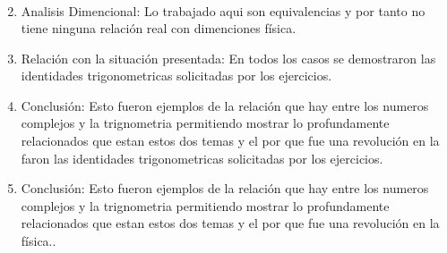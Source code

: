 \documentclass[12pt]{exam}
\begin{document}
\begin{enumerate}
\begin{align*}
				\end{align*}
			\item Analisis Dimencional: Lo trabajado aqui son equivalencias y por tanto no tiene ninguna relación real con dimenciones física.
			\item  Relación con la situación presentada: En todos los casos se demostraron las identidades trigonometricas solicitadas por los ejercicios.
			\item Conclusión: Esto fueron ejemplos de la relación que hay entre los numeros complejos y la trignometria permitiendo mostrar lo profundamente relacionados que estan estos dos temas y el por que fue una revolución en la faron las identidades trigonometricas solicitadas por los ejercicios.
			\item Conclusión: Esto fueron ejemplos de la relación que hay entre los numeros complejos y la trignometria permitiendo mostrar lo profundamente relacionados que estan estos dos temas y el por que fue una revolución en la física..
		\end{enumerate}
\end{document}
